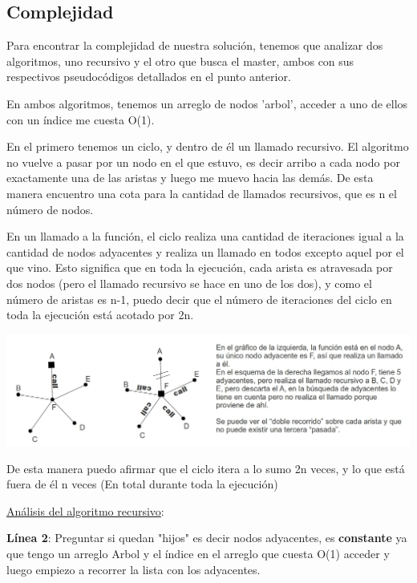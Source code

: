 \subsection{Complejidad}

Para encontrar la complejidad de nuestra solución, tenemos que analizar dos algoritmos, uno recursivo y el otro que busca el master, ambos con sus respectivos pseudocódigos detallados en el punto anterior.

En ambos algoritmos, tenemos un arreglo de nodos 'arbol', acceder a uno de ellos con un índice me cuesta O(1).

En el primero tenemos un ciclo, y dentro de él un llamado recursivo. El algoritmo no vuelve a pasar por un nodo en el que estuvo, es decir arribo a cada nodo por exactamente una de las aristas y luego me muevo hacia las demás. De esta manera encuentro una cota para la cantidad de llamados recursivos, que es n el número de nodos.

En un llamado a la función, el ciclo realiza una cantidad de iteraciones igual a la cantidad de nodos adyacentes y realiza un llamado en todos excepto aquel por el que vino. Esto significa que en toda la ejecución, cada arista es atravesada por dos nodos (pero el llamado recursivo se hace en uno de los dos), y como el número de aristas es n-1, puedo decir que el número de iteraciones del ciclo en toda la ejecución está acotado por 2n. 

\begin{center}
\includegraphics[scale=0.5]{ej2/2/graficos/imagen04.jpg} 
\end{center}

De esta manera puedo afirmar que el ciclo itera a lo sumo 2n veces, y lo que está fuera de él n veces (En total durante toda la ejecución)


\underline{Análisis del algoritmo recursivo}:

\textbf{Línea 2}: Preguntar si quedan "hijos" es decir nodos adyacentes, es \textbf{constante} ya que tengo un arreglo Arbol y el índice en el arreglo que cuesta O(1) acceder y luego empiezo a recorrer la lista con los adyacentes.


